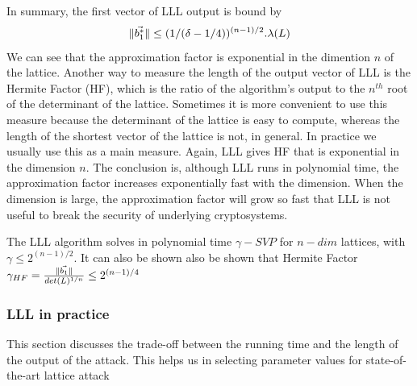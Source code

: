
In summary, the first vector of LLL output is bound by
\[
  \Vert \vec{b_1^*} \Vert \leq (1/(\delta-1/4))^{(n-1)/2}.\lambda(L)
\]
We can see that the approximation factor is exponential in the dimention $n$ of
the lattice. Another way to measure the length of the output vector of LLL is the Hermite
Factor (HF), which is the ratio of the algorithm's output to the $n^{th}$ root
of the determinant of the lattice. Sometimes it is more convenient to use this
measure because the determinant of the lattice is easy to compute,
whereas the length of the shortest vector of the lattice is not, in general. In
practice we usually use this as a main measure. Again, LLL gives HF that is
exponential in the dimension $n$. The conclusion is, although LLL runs in
polynomial time, the approximation factor increases exponentially fast with
the dimension. When the dimension is large, the approximation factor will grow
so fast that LLL is not useful to break the security of underlying
cryptosystems.
\begin{theorem}
  The LLL algorithm solves in polynomial time $\gamma-SVP$ for $n-dim$ lattices,
  with $\gamma \leq 2^{(n-1)/2}$. It can also be shown also be shown that Hermite Factor
  $\gamma_{HF} = \frac{\Vert \vec{b_1} \Vert}{det(L)^{1/n}} \leq 2^{(n-1)/4}$
  \label{theo:LLLHF}
\end{theorem}

\subsubsection{LLL in practice}
\label{sec:LLLinPractice}
This section discusses the trade-off between the running time and the length of
the output of the attack. This helps us in selecting parameter values for
state-of-the-art lattice attack

